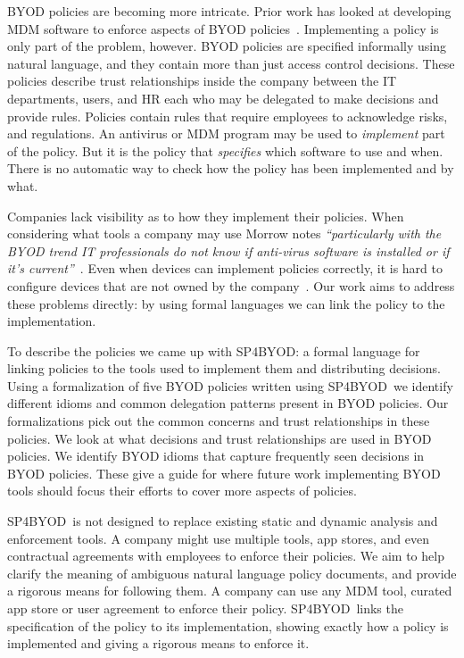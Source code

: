 \documentclass{llncs}
\newcommand{\AppPAL}[0]{SP4BYOD}
\begin{document}
BYOD policies are becoming more intricate.
Prior work has looked at developing \ac{MDM} software to enforce aspects of BYOD policies~\cite{costantino_towards_2013,martinelli_enhancing_2016,armando_enabling_2014}.
Implementing a policy is only part of the problem, however.
BYOD policies are specified informally using natural language, and they contain more than just access control decisions.
These policies describe trust relationships inside the company between the IT departments, users, and HR each who may be delegated to make decisions and provide rules.
Policies contain rules that require employees to acknowledge risks, and regulations.
An antivirus or \ac{MDM} program may be used to \emph{implement} part of the policy.
But it is the policy that \emph{specifies} which software to use and when. 
There is no automatic way to check how the policy has been implemented and by what.

Companies lack visibility as to how they implement their policies.
When considering what tools a company may use Morrow notes \emph{``particularly with the BYOD trend IT professionals do not know if anti-virus software is installed or if it's current''}~\cite{morrow_byod_2012}.
Even when devices can implement policies correctly, it is hard to configure devices that are not owned by the company~\cite{tokuyoshi_security_2013}.
Our work aims to address these problems directly: by using formal languages we can link the policy to the implementation.

To describe the policies we came up with \AppPAL{}: 
  a formal language for linking policies to the tools used to implement them and distributing decisions.
Using a formalization of five BYOD policies written using \AppPAL~we identify different idioms and common delegation patterns present in BYOD policies.
Our formalizations pick out the common concerns and trust relationships in these policies.
We look at what decisions and trust relationships are used in BYOD policies.
We identify BYOD idioms that capture frequently seen decisions in BYOD policies.
These give a guide for where future work implementing BYOD tools should focus their efforts to cover more aspects of policies.

\AppPAL~is not designed to replace existing static and dynamic analysis and enforcement tools.
A company might use multiple tools, app stores, and even contractual agreements with employees to enforce their policies.
We aim to help clarify the meaning of ambiguous natural language policy documents, and provide a rigorous means for following them.
A company can use any \ac{MDM} tool, curated app store or user agreement to enforce their policy.
\AppPAL~links the specification of the policy to its implementation, showing exactly how a policy is implemented and giving a rigorous means to enforce it.
\end{document}
